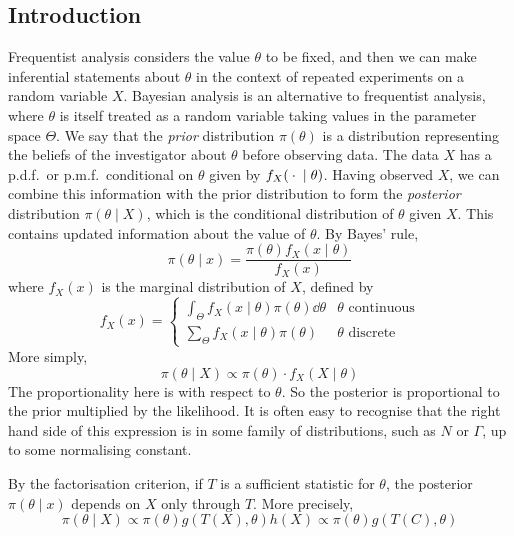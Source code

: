 \subsection{Introduction}
Frequentist analysis considers the value \( \theta \) to be fixed, and then we can make inferential statements about \( \theta \) in the context of repeated experiments on a random variable \( X \).
Bayesian analysis is an alternative to frequentist analysis, where \( \theta \) is itself treated as a random variable taking values in the parameter space \( \Theta \).
We say that the \textit{prior} distribution \( \pi(\theta) \) is a distribution representing the beliefs of the investigator about \( \theta \) before observing data.
The data \( X \) has a p.d.f.\ or p.m.f.\ conditional on \( \theta \) given by \( f_X({}\cdot{} \mid \theta) \).
Having observed \( X \), we can combine this information with the prior distribution to form the \textit{posterior} distribution \( \pi(\theta \mid X) \), which is the conditional distribution of \( \theta \) given \( X \).
This contains updated information about the value of \( \theta \).
By Bayes' rule,
\[ \pi(\theta \mid x) = \frac{\pi(\theta) f_X(x \mid \theta)}{f_X(x)} \]
where \( f_X(x) \) is the marginal distribution of \( X \), defined by
\[ f_X(x) = \begin{cases}
	\int_\Theta f_X(x\mid\theta) \pi(\theta) \dd{\theta} & \theta \text{ continuous} \\
	\sum_\Theta f_X(x\mid\theta) \pi(\theta) & \theta \text{ discrete}
\end{cases} \]
More simply,
\[ \pi(\theta \mid X) \propto \pi(\theta) \cdot f_X(X \mid \theta) \]
The proportionality here is with respect to \( \theta \).
So the posterior is proportional to the prior multiplied by the likelihood.
It is often easy to recognise that the right hand side of this expression is in some family of distributions, such as \( N \) or \( \Gamma \), up to some normalising constant.
\begin{remark}
	By the factorisation criterion, if \( T \) is a sufficient statistic for \( \theta \), the posterior \( \pi(\theta \mid x) \) depends on \( X \) only through \( T \).
	More precisely,
	\[ \pi(\theta \mid X) \propto \pi(\theta) g(T(X),\theta) h(X) \propto \pi(\theta) g(T(C),\theta) \]
\end{remark}
